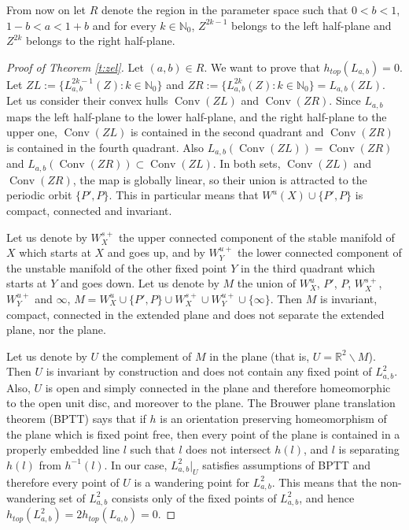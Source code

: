 \documentclass[12pt]{amsart}
\theoremstyle{plain}
\theoremstyle{definition}
\def\R{{\mathbb R}}
\def\N{{\mathbb N}}
\def\Conv{\mathop\mathrm{Conv}}
\renewcommand{\setminus}{\smallsetminus}
\begin{document}
	From now on let $R$ denote the region in the parameter space such 
	that $0 < b < 1$, $1 - b < a < 1 + b$ and for every $k \in \N_0$, 
	$Z^{2k-1}$ belongs to the left half-plane and $Z^{2k}$ belongs to 
	the right half-plane.
	
	\begin{proof}[Proof of Theorem \ref{t:zel}]
		Let $(a,b) \in R$. We want to prove that $h_{top}(L_{a,b}) = 0$. 
		Let $ZL := \{ L_{a,b}^{2k-1}(Z) : k \in \N_0 \}$ and	
		$ZR := \{ L_{a,b}^{2k}(Z) : k \in \N_0 \} =  L_{a,b}(ZL)$. 
		Let us consider their convex hulls $\Conv (ZL)$ and 
		$\Conv (ZR)$. Since $L_{a,b}$ maps the left half-plane to the 
		lower half-plane, and the right half-plane to the upper one, 
		$\Conv (ZL)$ is contained in the second quadrant and 
		$\Conv (ZR)$ is contained in the fourth quadrant. Also 
		$L_{a,b} (\Conv (ZL)) = \Conv (ZR)$ and 
		$L_{a,b} (\Conv (ZR)) \subset \Conv (ZL)$. In both sets, 
		$\Conv (ZL)$ and $\Conv (ZR)$, the map is globally linear, so 
		their union is attracted to the periodic orbit 
		$\{ P', P \}$. This in particular means that 
		$W^u(X) \cup \{P', P\}$ is compact, connected and invariant. 
		
		Let us denote by $W^{s+}_X$ the upper connected component of 
		the stable manifold of $X$ which starts at $X$ and goes up, 
		and by $W^{u+}_Y$ the lower connected component of the 
		unstable manifold of the other fixed point $Y$ in the third 
		quadrant which starts at $Y$ and goes down. Let us denote 
		by $M$ the union of $W^u_X$, $P'$, $P$, $W^{s+}_X$, 
		$W^{u+}_Y$ and $\infty$, 
		$M = W^u_X \cup \{ P', P \} \cup W^{s+}_X \cup W^{u+}_Y 
		\cup \{ \infty \}$. Then $M$ is invariant, compact, connected 
		in the extended plane and does not separate the extended 
		plane, nor the plane. 
		
		Let us denote by $U$ the complement of $M$ in the plane (that 
		is, $U=\R^2\setminus M$). Then $U$ is invariant by construction 
		and does not contain any fixed point of $L_{a,b}^2$. Also, $U$ 
		is open and simply connected in the plane and therefore 
		homeomorphic to the open unit disc, and moreover to the plane. 
		The Brouwer plane translation theorem (BPTT) says that if $h$ 
		is an orientation preserving homeomorphism of the plane which 
		is fixed point free, then every point of the plane is contained 
		in a properly embedded line $l$ such that $l$ does not intersect 
		$h(l)$, and $l$ is separating $h(l)$ from $h^{-1}(l)$. In our 
		case, $L_{a,b}^2|_U$ satisfies assumptions of BPTT and therefore 
		every point of $U$ is a wandering point for $L_{a,b}^2$. This 
		means that the non-wandering set of $L_{a,b}^2$ consists only 
		of the fixed points of $L_{a,b}^2$, and hence 
		$h_{top}(L_{a,b}^2) = 2h_{top}(L_{a,b}) = 0$. 
	\end{proof}
	
\end{document}
